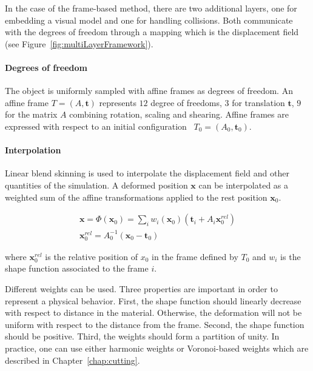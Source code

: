 In the case of the frame-based method, there are two additional layers, one for embedding a visual model and one for handling collisions. 
Both communicate with the degrees of freedom through a mapping which is the displacement field (see Figure~\ref{fig:multiLayerFramework}).

\paragraph{Degrees of freedom}
The object is uniformly sampled with affine frames as degrees of freedom. An affine frame $T=(A,\mathbf{t})$ represents $12$ degree of freedoms, $3$ for translation $\mathbf{t}$, $9$ for the matrix $A$ combining rotation, scaling and shearing. 
Affine frames are expressed with respect to an initial configuration ~$T_{0} = \left(A_{0}, \mathbf{t}_{0}\right)$.

\paragraph{Interpolation}
Linear blend skinning is used to interpolate the displacement field and other quantities of the simulation. A deformed position $\mathbf{x}$ can be interpolated as a weighted sum of the affine transformations applied to the rest position $\mathbf{x}_{0}$.

\begin{equation}
\label{eq:frameBasedDisplacementField}
\begin{array}{l}
\displaystyle \mathbf{x} = \Phi(\mathbf{x}_{0}) = \sum_{i} w_{i}(\mathbf{x}_{0})\left(\mathbf{t}_{i}+A_{i}\mathbf{x}_{0}^{rel}\right) \\
\displaystyle \mathbf{x}_{0}^{rel} = A_{0}^{-1}\left( \mathbf{x}_{0} - \mathbf{t}_{0} \right)
\end{array}
\end{equation}

where $\mathbf{x}_{0}^{rel}$ is the relative position of $x_{0}$ in the frame defined by $T_{0}$ and $w_{i}$ is the shape function associated to the frame $i$.

Different weights can be used. Three properties are important in order to represent a physical behavior. 
First, the shape function should linearly decrease with respect to distance in the material. 
Otherwise, the deformation will not be uniform with respect to the distance from the frame. 
Second, the shape function should be positive. 
Third, the weights should form a partition of unity. 
In practice, one can use either harmonic weights or Voronoi-based weights which are described in Chapter~\ref{chap:cutting}.

